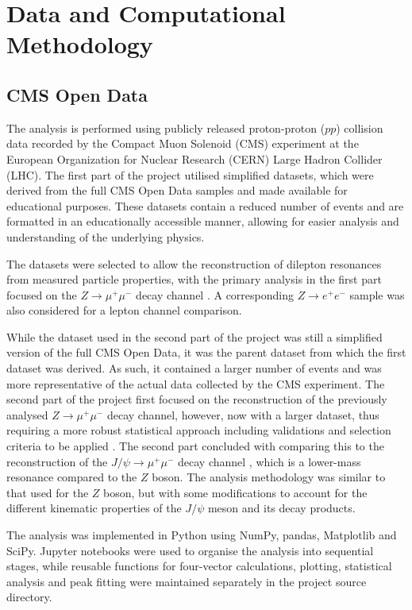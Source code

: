 \documentclass[11pt, a4paper]{article}
\numberwithin{equation}{section}
\begin{document}
\section{Data and Computational Methodology}

\subsection{CMS Open Data}

The analysis is performed using publicly released proton-proton ($pp$) collision data recorded by the Compact Muon Solenoid (CMS) experiment at the European Organization for Nuclear Research (CERN) Large Hadron Collider (LHC). The first part of the project utilised simplified datasets, which were derived from the full CMS Open Data samples and made available for educational purposes. These datasets contain a reduced number of events and are formatted in an educationally accessible manner, allowing for easier analysis and understanding of the underlying physics.

The datasets were selected to allow the reconstruction of dilepton resonances from measured particle properties, with the primary analysis in the first part focused on the $Z\rightarrow\mu^+\mu^-$ decay channel \cite{mccauley2019zmumusimplified}. A corresponding $Z\rightarrow e^+e^-$ sample \cite{mccauley2019zeesimplified} was also considered for a lepton channel comparison.

While the dataset used in the second part of the project was still a simplified version of the full CMS Open Data, it was the parent dataset from which the first dataset was derived. As such, it contained a larger number of events and was more representative of the actual data collected by the CMS experiment. The second part of the project first focused on the reconstruction of the previously analysed $Z\rightarrow\mu^+\mu^-$ decay channel, however, now with a larger dataset, thus requiring a more robust statistical approach including validations and selection criteria to be applied \cite{mccauley2017zmumu}. The second part concluded with comparing this to the reconstruction of the $J/\psi\rightarrow\mu^+\mu^-$ decay channel \cite{mccauley2017jpsimumu}, which is a lower-mass resonance compared to the $Z$ boson. The analysis methodology was similar to that used for the $Z$ boson, but with some modifications to account for the different kinematic properties of the $J/\psi$ meson and its decay products.

The analysis was implemented in Python using NumPy, pandas, Matplotlib and SciPy. Jupyter notebooks were used to organise the analysis into sequential stages, while reusable functions for four-vector calculations, plotting, statistical analysis and peak fitting were maintained separately in the project source directory.
\end{document}
